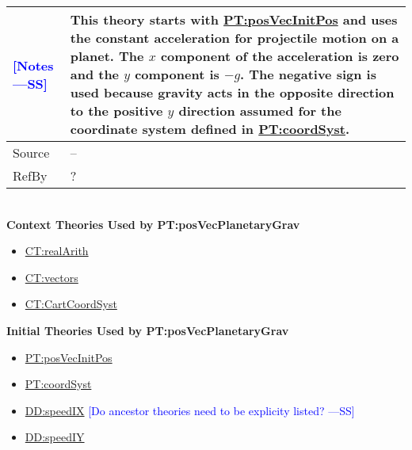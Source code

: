 \documentclass[12pt]{article}
\newcommand{\authornote}[3]{\textcolor{#1}{[#3 ---#2]}}
\newcommand{\authornote}[3]{}
\newcommand{\wss}[1]{\authornote{blue}{SS}{#1}}
\begin{document}
\begin{minipage}{\textwidth}
\begin{tabular}{>{\raggedright}p{}>{\raggedright\arraybackslash}p{}}
\\ \midrule \wss{Notes} & This theory starts with
\hyperref[PT:posVecInitPos]{PT:posVecInitPos} and uses the constant acceleration
for projectile motion on a planet.  The $x$ component of the acceleration is
zero and the $y$ component is $-g$.  The negative sign is used because gravity
acts in the opposite direction to the positive $y$ direction assumed for the
coordinate system defined in \hyperref[PT:coordSyst]{PT:coordSyst}.

\\ \midrule
Source & --
         
\\ \midrule
RefBy & ?

\\ \bottomrule
\end{tabular}
\end{minipage}
~\\

\noindent \textbf{Context Theories Used by PT:posVecPlanetaryGrav}

\begin{itemize}
\item \hyperref[CT:realArith]{CT:realArith}
\item \hyperref[CT:vectors]{CT:vectors}
\item \hyperref[CT:CartCoordSyst]{CT:CartCoordSyst}
\end{itemize}

\noindent \textbf{Initial Theories Used by PT:posVecPlanetaryGrav}

\begin{itemize}
\item \hyperref[PT:posVecInitPos]{PT:posVecInitPos}
\item \hyperref[PT:coordSyst]{PT:coordSyst}
\item \hyperref[DD:speedIX]{DD:speedIX} \wss{Do ancestor theories need to be explicity listed?}
\item \hyperref[DD:speedIY]{DD:speedIY}
\end{itemize}
\end{document}
